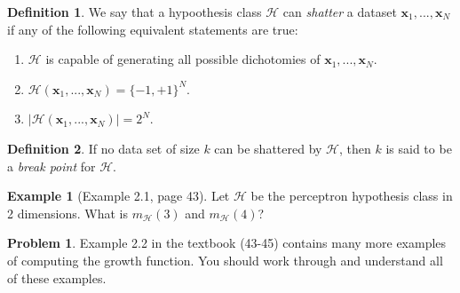 \documentclass[10pt]{exam}
\theoremstyle{definition}
\newtheorem{problem}{Problem}
\newtheorem{example}{Example}
\newtheorem{defn}{Definition}
\newtheorem{fact}{Fact}
\newcommand{\R}{\mathbb R}
\newcommand{\x}{\mathbf x}
\newcommand{\mH}{m_{\mathcal H}}
\begin{document}
\begin{defn}
    We say that a hypoothesis class $\mathcal H$ can \emph{shatter} a dataset $\x_1, ..., \x_N$ if any of the following equivalent statements are true:
    \begin{enumerate}
        \item $\mathcal H$ is capable of generating all possible dichotomies of $\x_1, ..., \x_N$.
        \item $\mathcal H(\x_1, ..., \x_N) = \{-1, +1\}^N$.
        \item $\left|\mathcal H(\x_1, ..., \x_N)\right| = 2^N$.
    \end{enumerate}
\end{defn}
\begin{defn}
    If no data set of size $k$ can be shattered by $\mathcal H$, then $k$ is said to be a \emph{break point} for $\mathcal H$.
\end{defn}

\begin{example}
    [Example 2.1, page 43]
    Let $\mathcal H$ be the perceptron hypothesis class in 2 dimensions.
    What is $\mH(3)$ and $\mH(4)$?
\end{example}

\vspace{6in}
\begin{problem}
    Example 2.2 in the textbook (43-45) contains many more examples of computing the growth function.
    You should work through and understand all of these examples.
\end{problem}
\newpage


\end{document}
